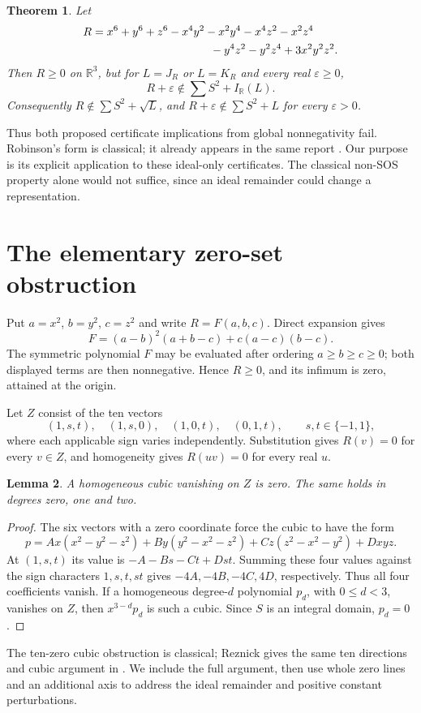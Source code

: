 \documentclass[11pt]{article}
\newtheorem{theorem}{Theorem}
\newtheorem{lemma}[theorem]{Lemma}
\newcommand{\SOS}{\sum S^2}
\begin{document}
\begin{theorem}\label{thm:main}
Let
\begin{align*}
 R={}&x^6+y^6+z^6-x^4y^2-x^2y^4-x^4z^2-x^2z^4\\
    &\hspace{32mm}-y^4z^2-y^2z^4+3x^2y^2z^2.
\end{align*}
Then $R\ge0$ on $\mathbb R^3$, but for $L=J_R$ or $L=K_R$ and every real
$\varepsilon\ge0$,
\[
 R+\varepsilon\notin\SOS+I_{\mathbb R}(L).
\]
Consequently $R\notin\SOS+\sqrt L$, and
$R+\varepsilon\notin\SOS+L$ for every $\varepsilon>0$.
\end{theorem}
Thus both proposed certificate implications from global nonnegativity fail.
Robinson's form is classical; it already appears in the same report
\cite[p.~798, equation~(2)]{report}. Our purpose is its explicit application
to these ideal-only certificates. The classical non-SOS property alone would
not suffice, since an ideal remainder could change a representation.

\section{The elementary zero-set obstruction}
Put $a=x^2$, $b=y^2$, $c=z^2$ and write $R=F(a,b,c)$. Direct expansion gives
\[
 F=(a-b)^2(a+b-c)+c(a-c)(b-c).
\]
The symmetric polynomial $F$ may be evaluated after ordering $a\ge b\ge c\ge0$;
both displayed terms are then nonnegative. Hence $R\ge0$, and its infimum is
zero, attained at the origin.

Let $Z$ consist of the ten vectors
\[
 (1,s,t),\quad (1,s,0),\quad (1,0,t),\quad (0,1,t),
 \qquad s,t\in\{-1,1\},
\]
where each applicable sign varies independently. Substitution gives $R(v)=0$
for every $v\in Z$, and homogeneity gives $R(uv)=0$ for every real $u$.

\begin{lemma}\label{lem:cubics}
A homogeneous cubic vanishing on $Z$ is zero. The same holds in degrees zero,
one and two.
\end{lemma}
\begin{proof}
The six vectors with a zero coordinate force the cubic to have the form
\[
 p=A x(x^2-y^2-z^2)+B y(y^2-x^2-z^2)
   +C z(z^2-x^2-y^2)+Dxyz.
\]
At $(1,s,t)$ its value is $-A-Bs-Ct+Dst$. Summing these four values against
the sign characters $1,s,t,st$ gives $-4A,-4B,-4C,4D$, respectively. Thus all
four coefficients vanish. If a homogeneous degree-$d$ polynomial $p_d$, with
$0\le d<3$, vanishes on $Z$, then $x^{3-d}p_d$ is such a cubic. Since $S$ is an
integral domain, $p_d=0$.
\end{proof}
The ten-zero cubic obstruction is classical; Reznick gives the same ten
directions and cubic argument in \cite[Section~4(b), p.~259]{reznick}.
We include the full argument, then use whole
zero lines and an additional axis to address the ideal remainder and positive
constant perturbations.
\end{document}
